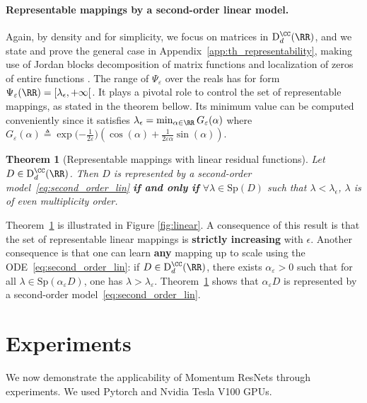 \documentclass{article}
\newtheorem{theorem}{Theorem}
\begin{document}
\paragraph{Representable mappings by a second-order linear model.}
Again, by density and for simplicity, we focus on matrices in $\mathrm{D}_{d}^{\CC}(\RR)$, and we state and prove the general case in Appendix~\ref{app:th_representability}, making use of Jordan blocks decomposition of matrix functions \citep{gant} and localization of zeros of entire functions \citep{runckel1969zeros}. 
The range of $\Psi_{\varepsilon}$ over the reals has for form $\Psi_{\varepsilon}(\RR) = [\lambda_\epsilon,+\infty[$. It plays a pivotal role to control the set of representable mappings, as stated in the theorem bellow. Its minimum value can be computed conveniently since it satisfies
$\lambda_\epsilon = \min_{\alpha \in \RR}G_{\varepsilon}(\alpha) $ where
$G_{\varepsilon}(\alpha) \triangleq \exp{(-\frac{1}{2 \varepsilon}})(\cos(\alpha) + \frac{1}{2\varepsilon \alpha} \sin(\alpha))$.
\begin{theorem}[Representable mappings with linear residual functions]\label{th:representability}
Let $D \in \mathrm{D}_{d}^{\CC}(\RR)$.
Then $D$ is represented by a second-order model~\eqref{eq:second_order_lin} \textbf{if and only if} $\forall \lambda \in \mathrm{Sp}(D)$ such that
$\lambda < \lambda_\epsilon $, $\lambda$ is of even multiplicity order.
\end{theorem}
Theorem~\ref{th:representability} is illustrated in Figure \ref{fig:linear}. 
A consequence of this result is that the set of representable linear mappings is \textbf{strictly increasing} with $\epsilon$.
Another consequence is that one can learn \textbf{any} mapping up to scale using the ODE~\eqref{eq:second_order_lin}: if $D \in \mathrm{D}_{d}^{\CC}(\RR)$, there exists $\alpha_{\varepsilon} > 0$ such that for all $\lambda \in \mathrm{Sp}(\alpha_{\varepsilon}D)$, one has $\lambda > \lambda_{\varepsilon}$. Theorem~\ref{th:representability} shows that $\alpha_{\varepsilon}D$ is represented by a second-order model~\eqref{eq:second_order_lin}.

\section{Experiments}

We now demonstrate the applicability of Momentum ResNets through experiments. We used Pytorch and Nvidia Tesla V100 GPUs. 
\end{document}
